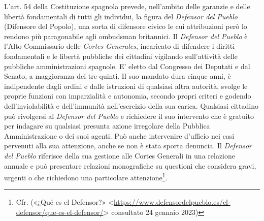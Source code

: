 \documentclass[12pt,it,a4paper,]{report}
\begin{document}
L'art. 54 della Costituzione spagnola prevede, nell'ambito delle
garanzie e delle libertà fondamentali di tutti gli individui, la figura
del \emph{Defensor del Pueblo} (Difensore del Popolo), una sorta di
difensore civico le cui attribuzioni però lo rendono più paragonabile
agli ombudsman britannici. Il \emph{Defensor del Pueblo} è l'Alto
Commissario delle \emph{Cortes Generales}, incaricato di difendere i
diritti fondamentali e le libertà pubbliche dei cittadini vigilando
sull'attività delle pubbliche amministrazioni spagnole. E' eletto dal
Congresso dei Deputati e dal Senato, a maggioranza dei tre quinti. Il
suo mandato dura cinque anni, è indipendente dagli ordini e dalle
istruzioni di qualsiasi altra autorità, svolge le proprie funzioni con
imparzialità e autonomia, secondo propri criteri e godendo
\hspace{0pt}\hspace{0pt}dell'inviolabilità e dell'immunità
nell'esercizio della sua carica. Qualsiasi cittadino può rivolgersi al
\emph{Defensor del Pueblo} e richiedere il suo intervento che è gratuito
per indagare su qualsiasi presunta azione irregolare della Pubblica
Amministrazione o dei suoi agenti. Può anche intervenire d'ufficio nei
casi pervenuti alla sua attenzione, anche se non è stata sporta
denuncia. Il \emph{Defensor del Pueblo} riferisce della sua gestione
alle Cortes Generali in una relazione annuale e può presentare relazioni
monografiche su questioni che considera gravi, urgenti o che richiedono
una particolare attenzione\footnote{Cfr. ({«¿Qué es el Defensor?»}
  \textless{}\url{https://www.defensordelpueblo.es/el-defensor/que-es-el-defensor/}\textgreater{}
  consultato 24 gennaio 2023)}.
\end{document}

